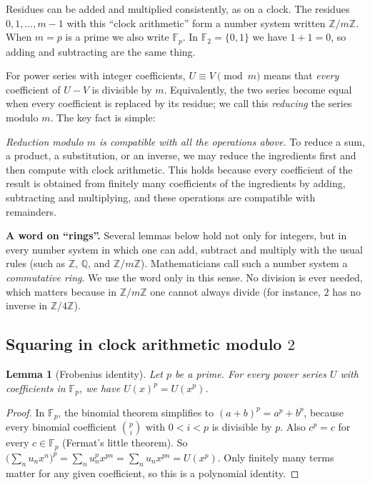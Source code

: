 \documentclass[11pt,a4paper]{article}
\newtheorem{lemma}[theorem]{Lemma}
\theoremstyle{definition}
\theoremstyle{remark}
\newcommand{\Z}{\mathbb{Z}}
\newcommand{\Q}{\mathbb{Q}}
\newcommand{\F}{\mathbb{F}}
\newcommand{\para}[1]{\par\medskip\noindent\textbf{#1}\enspace}
\begin{document}
Residues can be added and multiplied consistently, as on a clock. The residues $0,1,\dots,m-1$ with this ``clock
arithmetic'' form a number system written $\Z/m\Z$. When $m=p$ is a prime we also write $\F_p$. In $\F_2=\{0,1\}$ we
have $1+1=0$, so adding and subtracting are the same thing.

For power series with integer coefficients, $U\equiv V\pmod m$ means that \emph{every} coefficient of $U-V$ is
divisible by $m$. Equivalently, the two series become equal when every coefficient is replaced by its residue; we call
this \emph{reducing} the series modulo $m$. The key fact is simple:

\emph{Reduction modulo $m$ is compatible with all the operations above.} To reduce a sum, a product, a substitution, or
an inverse, we may reduce the ingredients first and then compute with clock arithmetic. This holds because every
coefficient of the result is obtained from finitely many coefficients of the ingredients by adding, subtracting and
multiplying, and these operations are compatible with remainders.

\para{A word on ``rings''.} Several lemmas below hold not only for integers, but in every number system in
which one can add, subtract and multiply with the usual rules (such as $\Z$, $\Q$, and $\Z/m\Z$). Mathematicians call
such a number system a \emph{commutative ring}. We use the word only in this sense. No division is ever needed, which
matters because in $\Z/m\Z$ one cannot always divide (for instance, $2$ has no inverse in $\Z/4\Z$).

\subsection{Squaring in clock arithmetic modulo \texorpdfstring{$2$}{2}}
\begin{lemma}[Frobenius identity]\label{lem:frobenius}
Let $p$ be a prime. For every power series $U$ with coefficients in $\F_p$, we have $U(x)^p=U(x^p)$.
\end{lemma}

\begin{proof}
In $\F_p$, the binomial theorem simplifies to $(a+b)^p=a^p+b^p$, because every binomial coefficient
$\binom pi$ with $0<i<p$ is divisible by $p$. Also $c^p=c$ for every $c\in\F_p$ (Fermat's little theorem). So
$\bigl(\sum_nu_nx^n\bigr)^p=\sum_nu_n^px^{pn}=\sum_nu_nx^{pn}=U(x^p)$. Only finitely many terms matter for any given
coefficient, so this is a polynomial identity.
\end{proof}
\end{document}

